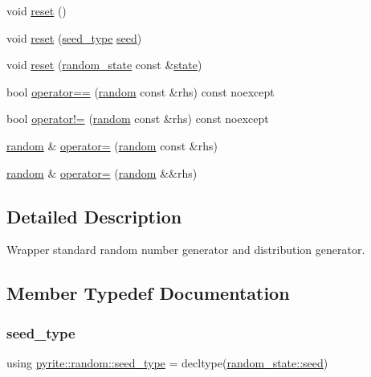 \begin{DoxyCompactItemize}
\item 
void \mbox{\hyperlink{classpyrite_1_1random_aed264da4ddd55aab1cf72ddb091ec902}{reset}} ()
\item 
void \mbox{\hyperlink{classpyrite_1_1random_a6d5947d6c425031e81f8488187a332f3}{reset}} (\mbox{\hyperlink{classpyrite_1_1random_a936dc9fd106c9b125ccbf3aa6d525e4b}{seed\+\_\+type}} \mbox{\hyperlink{classpyrite_1_1random_ae3a15129c724af7168f55135226c0dfc}{seed}})
\item 
void \mbox{\hyperlink{classpyrite_1_1random_a5abed1bb1fbd44ea3e62197a9b11dcd0}{reset}} (\mbox{\hyperlink{structpyrite_1_1random__state}{random\+\_\+state}} const \&\mbox{\hyperlink{classpyrite_1_1random_a25c469022ddee73c6a4ecce2814d22d4}{state}})
\item 
bool \mbox{\hyperlink{classpyrite_1_1random_a6c58ae19800d0e1f8388b6afbb79a1ba}{operator==}} (\mbox{\hyperlink{classpyrite_1_1random}{random}} const \&rhs) const noexcept
\item 
bool \mbox{\hyperlink{classpyrite_1_1random_aaef2fad3aa9ae947e7ed640db176373e}{operator!=}} (\mbox{\hyperlink{classpyrite_1_1random}{random}} const \&rhs) const noexcept
\item 
\mbox{\hyperlink{classpyrite_1_1random}{random}} \& \mbox{\hyperlink{classpyrite_1_1random_a3cd7cfec2938a1bd9541f34bf2b7ac77}{operator=}} (\mbox{\hyperlink{classpyrite_1_1random}{random}} const \&rhs)
\item 
\mbox{\hyperlink{classpyrite_1_1random}{random}} \& \mbox{\hyperlink{classpyrite_1_1random_a611890eeb411e9081e218d68bb507810}{operator=}} (\mbox{\hyperlink{classpyrite_1_1random}{random}} \&\&rhs)
\end{DoxyCompactItemize}


\subsection{Detailed Description}
Wrapper standard random number generator and distribution generator. 

\subsection{Member Typedef Documentation}
\mbox{\label{classpyrite_1_1random_a936dc9fd106c9b125ccbf3aa6d525e4b}} 
\subsubsection{\texorpdfstring{seed\+\_\+type}{seed\_type}}
{\footnotesize\ttfamily using \mbox{\hyperlink{classpyrite_1_1random_a936dc9fd106c9b125ccbf3aa6d525e4b}{pyrite\+::random\+::seed\+\_\+type}} =  decltype(\mbox{\hyperlink{structpyrite_1_1random__state_a0e2c55b67459b8e81c7d94cde7aab26a}{random\+\_\+state\+::seed}})}

